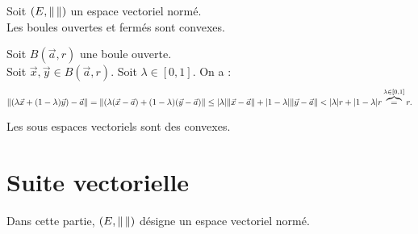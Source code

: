 \documentclass{book}
\begin{document}
\begin{Proposition}
    \begin{minipage}[c]{0.6\linewidth}{
Soit $(E,\mathopen\lVert \, \mathclose\rVert)$ un espace vectoriel normé.\\
Les boules ouvertes et fermés  sont convexes.}
\end{minipage} 
    \begin{minipage}[c]{0.3\linewidth}{
}
\end{minipage} 
\end{Proposition}
\begin{Demonstration}
Soit $B(\vec{a},r)$ une boule ouverte.\\
Soit $\vec{x},\vec{y}\in B(\vec{a},r).$ Soit $\lambda\in[0,1]$. On a :
$$ \mathopen\lVert (\lambda \vec{x} + (1-\lambda)\vec{y})-\vec{a}    \mathclose\rVert=\mathopen\lVert (\lambda(\vec{x}-\vec{a}) + (1-\lambda)(\vec{y}-\vec{a})    \mathclose\rVert\leq |\lambda|\mathopen\lVert \vec{x}-\vec{a} \mathclose\rVert+|1-\lambda|\mathopen\lVert \vec{y}-\vec{a} \mathclose\rVert< |\lambda|r+|1-\lambda|r\overbrace{=}^{\lambda\in[0,1]} r.$$
\end{Demonstration}
\begin{Exemple}
Les sous espaces vectoriels sont des convexes.
\end{Exemple}
\section{Suite vectorielle}
Dans cette partie, $(E,\mathopen\lVert \, \mathclose\rVert)$ désigne un espace vectoriel normé.
\end{document}
